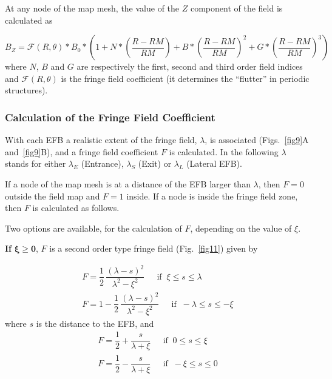 \noindent At  any node  of the map mesh, the value of the $Z$ 
component of the field is calculated as 

 \begin{equation}
	 B_Z =  \mathcal{F}(R,\theta) \ast  B_0 \ast  
	      \left(1+N \ast  
	           \left( \dfrac{R-RM }{ RM}\right) 
	           + B \ast  \left(\dfrac{R-RM }{ RM} \right)^2 
	           + G \ast  \left(\dfrac{R-RM }{ RM} \right)^3 
	      \right) 
 	\label{eq4-4-1}
 \end{equation}
%
 where  $ N$, $B $ and $ G $ are  respectively  the first, second and
third order field indices and $ \mathcal{F}(R,\theta)$ is the fringe field 
coefficient  (it determines the ``flutter''  in periodic structures).  


\subsubsection*{Calculation of the Fringe Field Coefficient} 

With  each EFB a realistic extent of the fringe field, $\lambda$, 
is associated (Figs.~\ref{fig9}A and~\ref{fig9}B),  
and a fringe field coefficient $ F$ is 
calculated. In the following $\lambda$ stands for either $ \lambda_ E $
(Entrance), $ \lambda_ S $ (Exit) or $ \lambda_ L $ (Lateral EFB). 
 
\noindent If a node of the map mesh is at a distance of the EFB larger than
$\lambda$, then $  F=0 $ outside the field map and $ F=1 $ inside.  
If a node is inside the fringe field zone, then $  F$   is calculated as follows. 

\bigskip 

\noindent Two options are available, for the calculation of $ F$, depending
on the value of $\xi$. 

\medskip
\noindent\textbf{If } $\mathbf{\xi  \geq 0}$, $ F $ is a  second
order type fringe field (Fig.~\ref{fig11}) given by 


\begin{gather}
		F  = \dfrac{1 }{ 2} \, \dfrac{(\lambda -s)^2 }{ \lambda^2-\xi^ 2} \quad 
		         ~~ \text{if }~   \xi  \leq  s \leq \lambda  \\
		F  = 1- \dfrac{1 }{ 2} \, \dfrac{(\lambda -s)^2 }{ \lambda^2-\xi^ 2}\quad 
		        ~~ \text{if }~   -\lambda  \leq  s \leq  -\xi 
\end{gather}
where $ s $ is the distance to the EFB, and
\begin{gather}
		 F  = \dfrac{1 }{ 2} + \dfrac{s }{ \lambda +\xi} \quad
		         ~~ \text{if }~  0 \leq  s \leq  \xi  \\
	    F   = \dfrac{1 }{ 2} - \dfrac{s }{ \lambda +\xi}\quad  
		       ~~ \text{if }~   -\xi  \leq  s \leq  0  
\end{gather}
 
